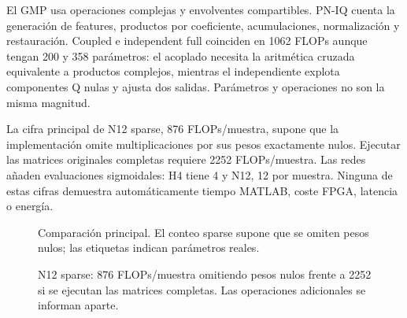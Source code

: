 \documentclass[10pt,a4paper]{article}
\begin{document}
El GMP usa operaciones complejas y envolventes compartibles. PN-IQ cuenta la
generación de features, productos por coeficiente, acumulaciones, normalización
y restauración. Coupled e independent full coinciden en 1062 FLOPs aunque tengan
200 y 358 parámetros: el acoplado necesita la aritmética cruzada equivalente a
productos complejos, mientras el independiente explota componentes Q nulas y
ajusta dos salidas. Parámetros y operaciones no son la misma magnitud.

La cifra principal de N12 sparse, 876 FLOPs/muestra, supone que la implementación
omite multiplicaciones por sus pesos exactamente nulos. Ejecutar las matrices
originales completas requiere 2252 FLOPs/muestra. Las redes añaden evaluaciones sigmoidales: H4 tiene
4 y N12, 12 por muestra. Ninguna de estas cifras demuestra automáticamente
tiempo MATLAB, coste FPGA, latencia o energía.

\begin{figure}[ht]
\centering
{}
\caption{Comparación principal. El conteo sparse supone que se omiten pesos nulos; las etiquetas indican parámetros reales.}
\label{fig:nmse-flops}
\end{figure}

\begin{figure}[ht]
\centering
{}
\caption{N12 sparse: 876 FLOPs/muestra omitiendo pesos nulos frente a 2252 si se ejecutan las matrices completas. Las operaciones adicionales se informan aparte.}
\label{fig:sparse-breakdown}
\end{figure}
\end{document}
